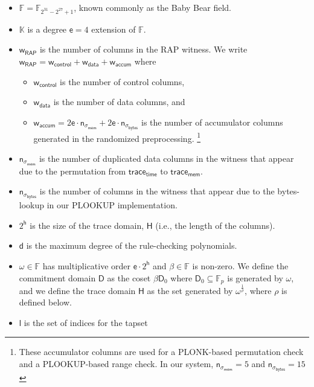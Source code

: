 \documentclass[10pt,letterpaper,titlepage]{article}
\newcommand{\GF}[1]{\mathbb{F}_{#1}}
\newcommand{\w}[0]{\omega}
\theoremstyle{definition}
\begin{document}
\begin{itemize}
  \item $\mathbb{F}=\mathbb{F}_{2^{31} - 2^{27} + 1}$, known commonly as the Baby Bear field. 
  \item $\mathbb{K}$ is a degree $\mathsf{e}=4$ extension of $\mathbb{F}$.
  \item $\mathsf{w}_\mathsf{RAP}$ is the number of columns in the RAP witness. 
  We write 
  $\mathsf{w}_\mathsf{RAP} = \mathsf{w}_\mathsf{control} + \mathsf{w}_\mathsf{data} + \mathsf{w}_\mathsf{accum}$ 
  where 
  \begin{itemize}
    \item $\mathsf{w}_\mathsf{control}$ is the number of control columns, 
    \item $\mathsf{w}_\mathsf{data}$ is the number of data columns, and 
    \item $\mathsf{w}_\mathsf{accum}=
    2\mathsf{e}\cdot\mathsf{n}_{\sigma_\mathsf{mem}}+2\mathsf{e}\cdot\mathsf{n}_{\sigma_\mathsf{bytes}}$ 
    is the number of accumulator columns generated in the randomized preprocessing.%
    \footnote{These accumulator columns are used for a PLONK-based permutation check and a PLOOKUP-based range check. 
    In our system, $\mathsf{n}_{\sigma_\mathsf{mem}}=5$ and $\mathsf{n}_{\sigma_\mathsf{bytes}}=15$}
  \end{itemize}
  \item $\mathsf{n}_{\sigma_\mathsf{mem}}$ is the number of duplicated data columns in the witness that appear due to the permutation from $\mathsf{trace_{time}}$ to $\mathsf{trace_{mem}}$. 
  \item $\mathsf{n}_{\sigma_\mathsf{bytes}}$ is the number of columns in the witness that appear due to the bytes-lookup in our PLOOKUP implementation. 
  \item $2^\mathsf{h}$ is the size of the trace domain, $\mathsf{H}$ (i.e., the length of the columns).
  \item $\mathsf{d}$ is the maximum degree of the rule-checking polynomials.
  \item $\w\in\mathbb{F}$ has multiplicative order $\mathsf{e}\cdot2^\mathsf{h}$ and $\beta\in\mathbb{F}$ is non-zero. 
  We define the commitment domain $\mathsf{D}$ as the coset $\beta \mathsf{D}_0$ where $\mathsf{D}_0\subseteq\GF{p}$ is generated by $\w$, 
  and we define the trace domain $\mathsf{H}$ as the set generated by $\w^\frac{1}{\mathsf{\rho}}$, where $\rho$ is defined below. 
  \item $\mathsf{l}$ is the set of indices for the tapset%

\end{itemize}
\end{document}
